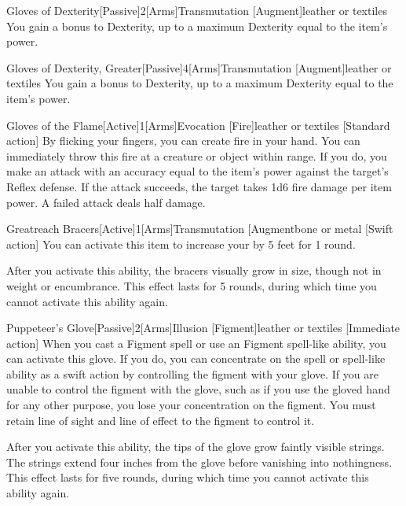 \begin{magicitemdef}{Gloves of Dexterity}[Passive]{2}[Arms]{Transmutation [Augment]}{leather or textiles}
     You gain a  bonus to Dexterity, up to a maximum Dexterity equal to the item's power.
\end{magicitemdef}

\begin{magicitemdef}{Gloves of Dexterity, Greater}[Passive]{4}[Arms]{Transmutation [Augment]}{leather or textiles}
     You gain a  bonus to Dexterity, up to a maximum Dexterity equal to the item's power.
\end{magicitemdef}

\begin{magicitemdef}{Gloves of the Flame}[Active]{1}[Arms]{Evocation [Fire]}{leather or textiles}
    [Standard action] By flicking your fingers, you can create fire in your hand.
    You can immediately throw this fire at a creature or object within \rngclose range.
    If you do, you make an attack with an accuracy equal to the item's power against the target's Reflex defense.
    If the attack succeeds, the target takes 1d6 fire damage per item power.
    A failed attack deals half damage.
\end{magicitemdef}

\begin{magicitemdef}{Greatreach Bracers}[Active]{1}[Arms]{Transmutation [Augment}{bone or metal}
    [Swift action] You can activate this item to increase your  by 5 feet for 1 round.

    After you activate this ability, the bracers visually grow in size, though not in weight or encumbrance.
    This effect lasts for 5 rounds, during which time you cannot activate this ability again.
\end{magicitemdef}

\begin{magicitemdef}{Puppeteer's Glove}[Passive]{2}[Arms]{Illusion [Figment]}{leather or textiles}
    [Immediate action] When you cast a Figment spell or use an Figment spell-like ability, you can activate this glove.
    If you do, you can concentrate on the spell or spell-like ability as a swift action by controlling the figment with your glove.
    If you are unable to control the figment with the glove, such as if you use the gloved hand for any other purpose, you lose your concentration on the figment.
    You must retain line of sight and line of effect to the figment to control it.

    After you activate this ability, the tips of the glove grow faintly visible strings.
    The strings extend four inches from the glove before vanishing into nothingness.
    This effect lasts for five rounds, during which time you cannot activate this ability again.
\end{magicitemdef}

